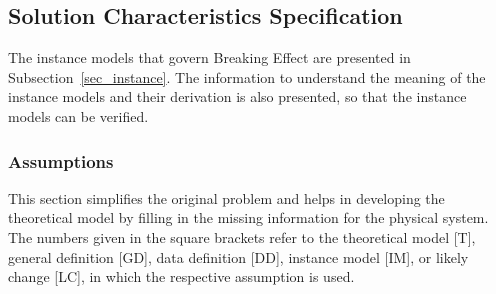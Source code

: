 \documentclass[12pt]{article}
\newcommand{\progname}{Breaking Effect} %
\begin{document}
	\subsection{Solution Characteristics Specification}
	
	The instance models that govern \progname{} are presented in
	Subsection~\ref{sec_instance}.  The information to understand the meaning of the
	instance models and their derivation is also presented, so that the instance
	models can be verified.
	
	\subsubsection{Assumptions}
	
	This section simplifies the original problem and helps in developing the
	theoretical model by filling in the missing information for the physical
	system. The numbers given in the square brackets refer to the theoretical model
	[T], general definition [GD], data definition [DD], instance model [IM], or
	likely change [LC], in which the respective assumption is used.
	
\end{document}
